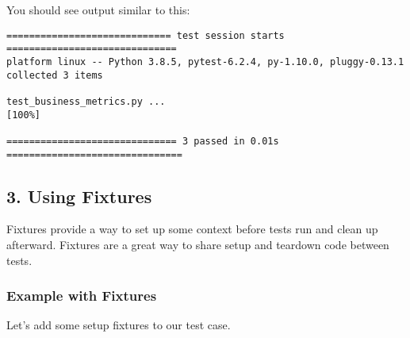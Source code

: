 \documentclass[
  letterpaper,
  DIV=11,
  numbers=noendperiod]{scrreprt}
\begin{document}
You should see output similar to this:

\begin{verbatim}
============================= test session starts ==============================
platform linux -- Python 3.8.5, pytest-6.2.4, py-1.10.0, pluggy-0.13.1
collected 3 items                                                              

test_business_metrics.py ...                                              [100%]

============================== 3 passed in 0.01s ===============================
\end{verbatim}

\subsection{3. Using Fixtures}\label{using-fixtures}

Fixtures provide a way to set up some context before tests run and clean
up afterward. Fixtures are a great way to share setup and teardown code
between tests.

\subsubsection{Example with Fixtures}\label{example-with-fixtures-1}

Let's add some setup fixtures to our test case.
\end{document}
